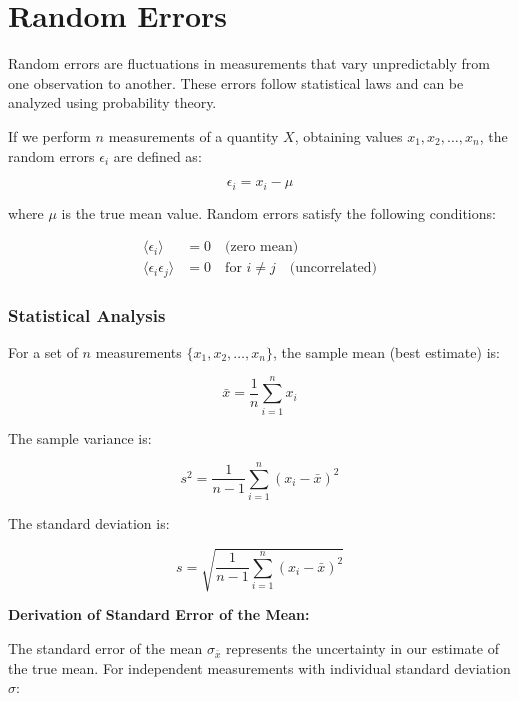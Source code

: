 \documentclass[twoside]{book}
\begin{document}
\section{Random Errors}

Random errors are fluctuations in measurements that vary unpredictably from one observation to another. These errors follow statistical laws and can be analyzed using probability theory.

If we perform $n$ measurements of a quantity $X$, obtaining values $x_1, x_2, \ldots, x_n$, the random errors $\epsilon_i$ are defined as:

\begin{equation*}
\epsilon_i = x_i - \mu
\end{equation*}

where $\mu$ is the true mean value. Random errors satisfy the following conditions:

\begin{align*}
\langle \epsilon_i \rangle &= 0 \quad \text{(zero mean)} \\
\langle \epsilon_i \epsilon_j \rangle &= 0 \quad \text{for } i \neq j \quad \text{(uncorrelated)}
\end{align*}

\subsubsection{Statistical Analysis}

For a set of $n$ measurements $\{x_1, x_2, \ldots, x_n\}$, the sample mean (best estimate) is:

\begin{equation}
\bar{x} = \frac{1}{n}\sum_{i=1}^{n} x_i
\end{equation}

The sample variance is:

\begin{equation}
s^2 = \frac{1}{n-1}\sum_{i=1}^{n}(x_i - \bar{x})^2
\end{equation}

The standard deviation is:

\begin{equation}
s = \sqrt{\frac{1}{n-1}\sum_{i=1}^{n}(x_i - \bar{x})^2}
\end{equation}

\textbf{Derivation of Standard Error of the Mean:}

The standard error of the mean $\sigma_{\bar{x}}$ represents the uncertainty in our estimate of the true mean. For independent measurements with individual standard deviation $\sigma$:
\end{document}
